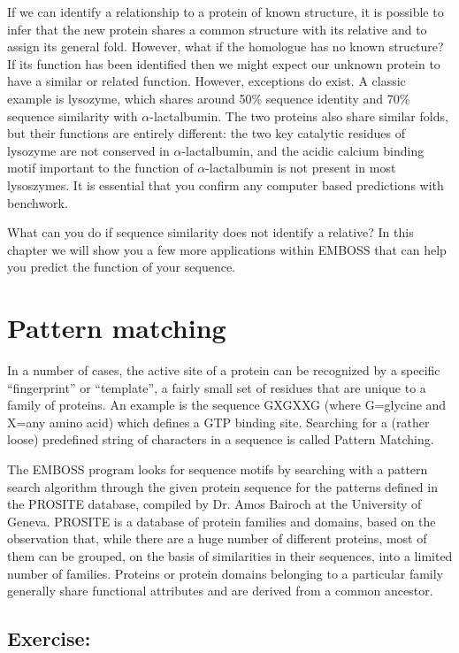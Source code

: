 \documentclass[12pt]{report}
\begin{document}
If we can identify a relationship to a protein of known	structure, it
is possible to infer that the new protein shares a common structure
with its relative and to assign	its general fold. However, what	if the
homologue has no known structure?  If its function has been identified
then we	might expect our unknown protein to have a similar or related
function. However, exceptions do exist.	A classic example is
lysozyme, which	shares around 50\% sequence identity and 70\% sequence
similarity with	$\alpha$-lactalbumin. The two proteins also share
similar	folds, but their functions are entirely	different: the two key
catalytic residues of lysozyme are not conserved in
$\alpha$-lactalbumin, and the acidic calcium binding motif important
to the function	of $\alpha$-lactalbumin	is not present in most
lysoszymes. It is essential that you confirm any computer based
predictions with benchwork.

What can you do	if sequence similarity does not	identify a relative?
In this	chapter	we will	show you a few more applications within	EMBOSS
that can help you predict the function of your sequence.

\section{Pattern matching}
In a number of cases, the active site of a protein can be recognized
by a specific ``fingerprint'' or ``template'', a fairly	small set of
residues that are unique to a family of	proteins. An example is	the
sequence GXGXXG	(where G=glycine and X=any amino acid) which defines a
GTP binding site. Searching for	a (rather loose) predefined string of
characters in a	sequence is called Pattern Matching.

The EMBOSS program 	looks for sequence motifs by
searching with a pattern search	algorithm through the given protein
sequence for the patterns defined in the PROSITE database, compiled by
Dr. Amos Bairoch at the	University of Geneva. PROSITE is a database of
protein	families and domains, based on the observation that,
while there are	a huge number of different proteins, most of them can
be grouped, on the basis of similarities in their sequences, into a
limited	number of families. Proteins or	protein	domains	belonging to a
particular family generally share functional attributes	and are
derived	from a common ancestor.

\subsection*{Exercise: }
\end{document}
